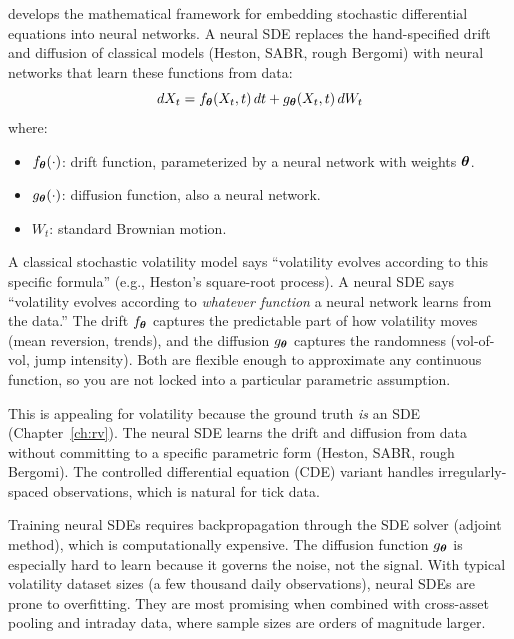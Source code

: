 \citet{Kidger2021NeuralSDE} develops the mathematical framework for embedding stochastic differential equations into neural networks.
A neural SDE replaces the hand-specified drift and diffusion of classical models (Heston, SABR, rough Bergomi) with neural networks that learn these functions from data:
\begin{equation}\label{eq:neural-sde}
  dX_t = f_{\bm{\theta}}(X_t, t)\,dt + g_{\bm{\theta}}(X_t, t)\,dW_t
\end{equation}
where:
\begin{itemize}[nosep]
  \item $f_{\bm{\theta}}(\cdot)$: drift function, parameterized by a neural network with weights $\bm{\theta}$.
  \item $g_{\bm{\theta}}(\cdot)$: diffusion function, also a neural network.
  \item $W_t$: standard Brownian motion.
\end{itemize}

\begin{intuition}
A classical stochastic volatility model says ``volatility evolves according to this specific formula'' (e.g., Heston's square-root process).
A neural SDE says ``volatility evolves according to \emph{whatever function} a neural network learns from the data.''
The drift $f_{\bm{\theta}}$ captures the predictable part of how volatility moves (mean reversion, trends), and the diffusion $g_{\bm{\theta}}$ captures the randomness (vol-of-vol, jump intensity).
Both are flexible enough to approximate any continuous function, so you are not locked into a particular parametric assumption.
\end{intuition}

This is appealing for volatility because the ground truth \emph{is} an SDE (Chapter~\ref{ch:rv}).
The neural SDE learns the drift and diffusion from data without committing to a specific parametric form (Heston, SABR, rough Bergomi).
The controlled differential equation (CDE) variant handles irregularly-spaced observations, which is natural for tick data.

\begin{warning}
Training neural SDEs requires backpropagation through the SDE solver (adjoint method), which is computationally expensive.
The diffusion function $g_{\bm{\theta}}$ is especially hard to learn because it governs the noise, not the signal.
With typical volatility dataset sizes (a few thousand daily observations), neural SDEs are prone to overfitting.
They are most promising when combined with cross-asset pooling and intraday data, where sample sizes are orders of magnitude larger.
\end{warning}

